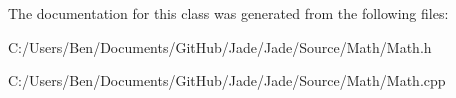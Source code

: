 The documentation for this class was generated from the following files\+:\begin{DoxyCompactItemize}
\item 
C\+:/\+Users/\+Ben/\+Documents/\+Git\+Hub/\+Jade/\+Jade/\+Source/\+Math/Math.\+h\item 
C\+:/\+Users/\+Ben/\+Documents/\+Git\+Hub/\+Jade/\+Jade/\+Source/\+Math/Math.\+cpp\end{DoxyCompactItemize}
